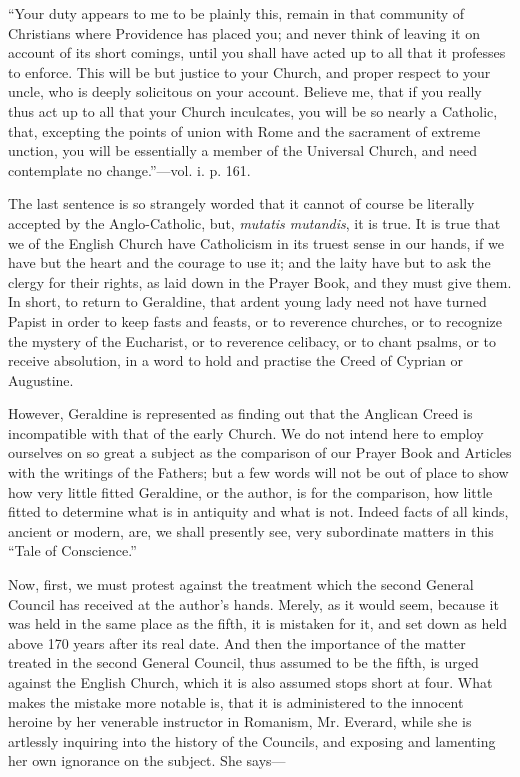 ``Your duty appears to me to be
plainly this, remain in that community of Christians where Providence
has placed you; and never think of leaving it on account of its short
comings, until you shall have acted up to all that it professes to
enforce. This will be but justice to your Church, and proper respect to
your uncle, who is deeply solicitous on your account. Believe me, that
if you really thus act up to all that your Church inculcates, you will
be so nearly a Catholic, that, excepting the points of union with Rome
and the sacrament of extreme unction, you will be essentially a member
of the Universal Church, and need contemplate no change.''—vol. i. p.
161.

The last sentence is so strangely worded that it
cannot of course be literally accepted by the Anglo-Catholic, but, \emph{mutatis
mutandis}, it is true. It is true that we of the English Church have
Catholicism in its truest sense in our hands, if we have but the heart
and the courage to use it; and the laity have but to ask the clergy for
their rights, as laid down in the Prayer Book, and they must give them.
In short, to return to Geraldine, that ardent young lady need not have
turned Papist in order to keep fasts and feasts, or to reverence
churches, or to recognize the mystery of the Eucharist, or to reverence
celibacy, or to chant psalms, or to receive absolution, in a word to
hold and practise the Creed of Cyprian or Augustine.

However, Geraldine is represented as finding out
that the Anglican Creed is incompatible with that of the early Church.
We do not intend here to employ ourselves on so great a subject as the
comparison of our Prayer Book and Articles with the writings of the
Fathers; but a few words will not be out of place to show how very
little fitted Geraldine, or the author, is for the comparison, how
little fitted to determine what is in antiquity and what is not. Indeed
facts of all kinds, ancient or modern, are, we shall presently see, very
subordinate matters in this ``Tale of Conscience.''

Now, first, we must protest against the treatment
which the second General Council has received at the author's hands.
Merely, as it would seem, because it was held in the same place as the
fifth, it is mistaken for it, and set down as held above 170 years after
its real date. And then the importance of the matter treated in the
second General Council, thus assumed to be the fifth, is urged against
the English Church, which it is also assumed stops short at four. What
makes the mistake more notable is, that it is administered to the
innocent heroine by her venerable instructor in Romanism, Mr. Everard,
while she is artlessly inquiring into the history of the Councils, and
exposing and lamenting her own ignorance on the subject. She says—

